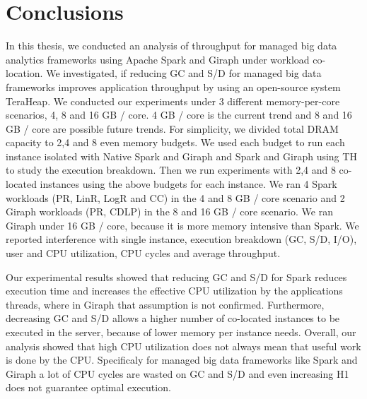\section{Conclusions}

In this thesis, we conducted an analysis of throughput for managed big data analytics frameworks
using Apache Spark and Giraph under workload co-location. We investigated, if reducing GC and S/D for managed big data frameworks improves application throughput by using an open-source system TeraHeap. We conducted our experiments under 3 different memory-per-core
scenarios, 4, 8 and 16 GB / core. 4 GB / core is the current trend and 8 and 16 GB / core are possible future trends.
For simplicity, we divided total DRAM capacity to 2,4 and 8 even memory budgets. We used each budget to run each instance isolated with Native Spark and Giraph and Spark and Giraph using TH to study the execution breakdown.
Then we run experiments with 2,4 and 8 co-located instances using the above budgets for each instance. We ran 4 Spark workloads (PR, LinR, LogR and CC) in the 4 and 8 GB / core scenario and 2 Giraph workloads (PR, CDLP) in the 8 and 16 GB / core scenario. We ran Giraph under 16 GB / core, because it is more memory intensive than Spark. We reported interference with single instance, execution breakdown (GC, S/D, I/O), user and CPU utilization, CPU cycles and average throughput.

Our experimental results showed that reducing GC and S/D for Spark reduces execution time and increases the effective CPU utilization by the applications threads, where in Giraph that assumption is not confirmed. Furthermore, decreasing GC and S/D allows a higher number of co-located instances to be executed in the server, because of lower memory per instance needs. Overall, our analysis showed that high CPU utilization does not always mean that useful work is done by the CPU. Specificaly for managed
big data frameworks like Spark and Giraph a lot of CPU cycles are wasted on GC and S/D and even increasing H1 does not guarantee optimal execution.


